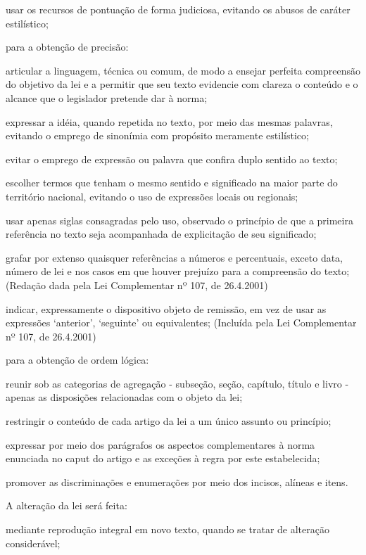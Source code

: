 \documentclass[calibri]{brlex2}
\begin{document}
\alinea usar os recursos de pontuação de forma judiciosa, evitando os abusos de caráter estilístico;

\inc para a obtenção de precisão:

\alinea articular a linguagem, técnica ou comum, de modo a ensejar perfeita compreensão do objetivo da lei e a permitir que seu texto evidencie com clareza o conteúdo e o alcance que o legislador pretende dar à norma;

\alinea expressar a idéia, quando repetida no texto, por meio das mesmas palavras, evitando o emprego de sinonímia com propósito meramente estilístico;

\alinea evitar o emprego de expressão ou palavra que confira duplo sentido ao texto;

\alinea escolher termos que tenham o mesmo sentido e significado na maior parte do território nacional, evitando o uso de expressões locais ou regionais;

\alinea usar apenas siglas consagradas pelo uso, observado o princípio de que a primeira referência no texto seja acompanhada de explicitação de seu significado;

\alinea grafar por extenso quaisquer referências a números e percentuais, exceto data, número de lei e nos casos em que houver prejuízo para a compreensão do texto;   (Redação dada pela Lei Complementar nº 107, de 26.4.2001)

\alinea indicar, expressamente o dispositivo objeto de remissão, em vez de usar as expressões ‘anterior’, ‘seguinte’ ou equivalentes;    (Incluída pela Lei Complementar nº 107, de 26.4.2001)

\inc para a obtenção de ordem lógica:

\alinea reunir sob as categorias de agregação - subseção, seção, capítulo, título e livro - apenas as disposições relacionadas com o objeto da lei;

\alinea restringir o conteúdo de cada artigo da lei a um único assunto ou princípio;

\alinea expressar por meio dos parágrafos os aspectos complementares à norma enunciada no caput do artigo e as exceções à regra por este estabelecida;

\alinea promover as discriminações e enumerações por meio dos incisos, alíneas e itens.


\art A alteração da lei será feita:

\inc mediante reprodução integral em novo texto, quando se tratar de alteração considerável;
\end{document}
